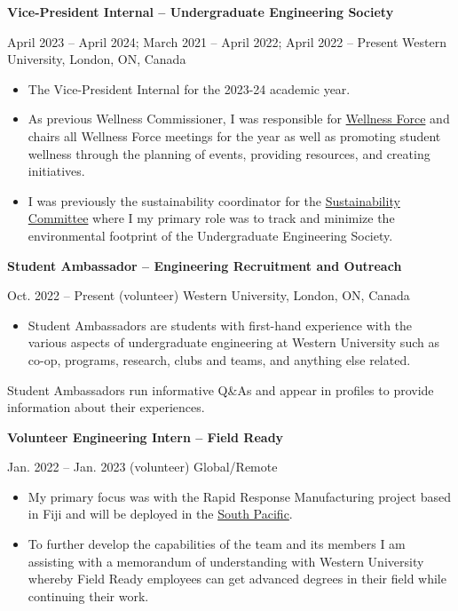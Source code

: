 \documentclass[
]{article}
\begin{document}
\textbf{Vice-President Internal -- Undergraduate Engineering Society}

April 2023 -- April 2024; March 2021 -- April 2022; April 2022 --
Present \textbar{} Western University, London, ON, Canada

\begin{itemize}
      \item
            The Vice-President Internal for the 2023-24 academic year.
      \item
            As previous Wellness Commissioner, I was responsible for
            \href{https://wellnessforce.wixsite.com/website}{Wellness Force} and
            chairs all Wellness Force meetings for the year as well as promoting
            student wellness through the planning of events, providing resources,
            and creating initiatives.
      \item
            I was previously the sustainability coordinator for the
            \href{https://sustainability.uwo.ca/get_involved/join_a_office/index.html}{Sustainability
                  Committee} where I my primary role was to track and minimize the
            environmental footprint of the Undergraduate Engineering Society.
\end{itemize}

\textbf{Student Ambassador -- Engineering Recruitment and Outreach}

Oct. 2022 -- Present (volunteer) \textbar{} Western University, London,
ON, Canada

\begin{itemize}
      \item
            Student Ambassadors are students with first-hand experience with the
            various aspects of undergraduate engineering at Western University
            such as co-op, programs, research, clubs and teams, and anything else
            related.
\end{itemize}

Student Ambassadors run informative Q\&As and appear in profiles to
provide information about their experiences.

\textbf{Volunteer Engineering Intern -- Field Ready}

Jan. 2022 -- Jan. 2023 (volunteer) \textbar{} Global/Remote

\begin{itemize}
      \item
            My primary focus was with the Rapid Response Manufacturing project
            based in Fiji and will be deployed in the
            \href{https://www.fieldready.org/emergencies}{South Pacific}.
      \item
            To further develop the capabilities of the team and its members I am
            assisting with a memorandum of understanding with Western University
            whereby Field Ready employees can get advanced degrees in their field
            while continuing their work.
\end{itemize}
\end{document}
